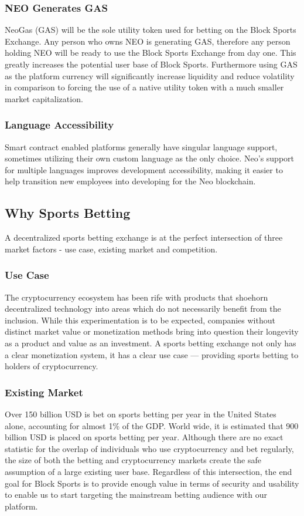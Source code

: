 \documentclass{article}
\begin{document}
		\subsubsection{NEO Generates GAS}
NeoGas (GAS) will be the sole utility token used for betting on the Block Sports Exchange. Any person who owns NEO is generating GAS, therefore any person holding NEO will be ready to use the Block Sports Exchange from day one. This greatly increases the potential user base of Block Sports. Furthermore using GAS as the platform currency will significantly increase liquidity and reduce volatility in comparison to forcing the use of a native utility token with a much smaller market capitalization.

		\subsubsection{Language Accessibility}
Smart contract enabled platforms generally have singular language support, sometimes utilizing their own custom language as the only choice. Neo’s support for multiple languages improves development accessibility, making it easier to help transition new employees into developing for the Neo blockchain.

	\subsection{Why Sports Betting}
A decentralized sports betting exchange is at the perfect intersection of three market factors - use case, existing market and competition.

		\subsubsection{Use Case}
The cryptocurrency ecosystem has been rife with products that shoehorn decentralized technology into areas which do not necessarily benefit from the inclusion. While this experimentation is to be expected, companies without distinct market value or monetization methods bring into question their longevity as a product and value as an investment. A sports betting exchange not only has a clear monetization system, it has a clear use case --- providing sports betting to holders of cryptocurrency.


		\subsubsection{Existing Market}
Over 150 billion USD is bet on sports betting per year in the United States alone, accounting for almost 1\% of the GDP. World wide, it is estimated that 900 billion USD is placed on sports betting per year. Although there are no exact statistic for the overlap of individuals who use cryptocurrency and bet regularly, the size of both the betting and cryptocurrency markets create the safe assumption of a large existing user base. Regardless of this intersection, the end goal for Block Sports is to provide enough value in terms of security and usability to enable us to start targeting the mainstream betting audience with our platform.
\end{document}
